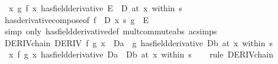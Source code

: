 \begin{isabellebody}
\ \ {\isacharparenleft}{\kern0pt}{\isacharparenleft}{\kern0pt}{\isasymlambda}x{\isachardot}{\kern0pt}\ g\ {\isacharparenleft}{\kern0pt}f\ x{\isacharparenright}{\kern0pt}{\isacharparenright}{\kern0pt}\ has{\isacharunderscore}{\kern0pt}field{\isacharunderscore}{\kern0pt}derivative\ E\ {\isacharasterisk}{\kern0pt}\ D{\isacharparenright}{\kern0pt}\ {\isacharparenleft}{\kern0pt}at\ x\ within\ s{\isacharparenright}{\kern0pt}{\isachardoublequoteclose}\isanewline
%
\isadelimproof
\ \ %
\endisadelimproof
%
\isatagproof
{}\isamarkupfalse%
\ has{\isacharunderscore}{\kern0pt}derivative{\isacharunderscore}{\kern0pt}compose{\isacharbrackleft}{\kern0pt}of\ f\ {\isachardoublequoteopen}{\isacharparenleft}{\kern0pt}{\isacharasterisk}{\kern0pt}{\isacharparenright}{\kern0pt}\ D{\isachardoublequoteclose}\ x\ s\ g\ {\isachardoublequoteopen}{\isacharparenleft}{\kern0pt}{\isacharasterisk}{\kern0pt}{\isacharparenright}{\kern0pt}\ E{\isachardoublequoteclose}{\isacharbrackright}{\kern0pt}\isanewline
\ \ \isamarkupfalse%
\ {\isacharparenleft}{\kern0pt}simp\ only{\isacharcolon}{\kern0pt}\ has{\isacharunderscore}{\kern0pt}field{\isacharunderscore}{\kern0pt}derivative{\isacharunderscore}{\kern0pt}def\ mult{\isacharunderscore}{\kern0pt}commute{\isacharunderscore}{\kern0pt}abs\ ac{\isacharunderscore}{\kern0pt}simps{\isacharparenright}{\kern0pt}%
\endisatagproof
{\isafoldproof}%
%
\isadelimproof
\isanewline
%
\endisadelimproof
\isanewline
{}\isamarkupfalse%
\ DERIV{\isacharunderscore}{\kern0pt}chain{}{\isacharcolon}{\kern0pt}\ {\isachardoublequoteopen}DERIV\ f\ {\isacharparenleft}{\kern0pt}g\ x{\isacharparenright}{\kern0pt}\ {\isacharcolon}{\kern0pt}{\isachargreater}{\kern0pt}\ Da\ {\isasymLongrightarrow}\ {\isacharparenleft}{\kern0pt}g\ has{\isacharunderscore}{\kern0pt}field{\isacharunderscore}{\kern0pt}derivative\ Db{\isacharparenright}{\kern0pt}\ {\isacharparenleft}{\kern0pt}at\ x\ within\ s{\isacharparenright}{\kern0pt}\ {\isasymLongrightarrow}\isanewline
\ \ {\isacharparenleft}{\kern0pt}{\isacharparenleft}{\kern0pt}{\isasymlambda}x{\isachardot}{\kern0pt}\ f\ {\isacharparenleft}{\kern0pt}g\ x{\isacharparenright}{\kern0pt}{\isacharparenright}{\kern0pt}\ has{\isacharunderscore}{\kern0pt}field{\isacharunderscore}{\kern0pt}derivative\ Da\ {\isacharasterisk}{\kern0pt}\ Db{\isacharparenright}{\kern0pt}\ {\isacharparenleft}{\kern0pt}at\ x\ within\ s{\isacharparenright}{\kern0pt}{\isachardoublequoteclose}\isanewline
%
\isadelimproof
\ \ %
\endisadelimproof
%
\isatagproof
{}\isamarkupfalse%
\ {\isacharparenleft}{\kern0pt}rule\ DERIV{\isacharunderscore}{\kern0pt}chain{\isacharprime}{\kern0pt}{\isacharparenright}{\kern0pt}%

\end{isabellebody}
